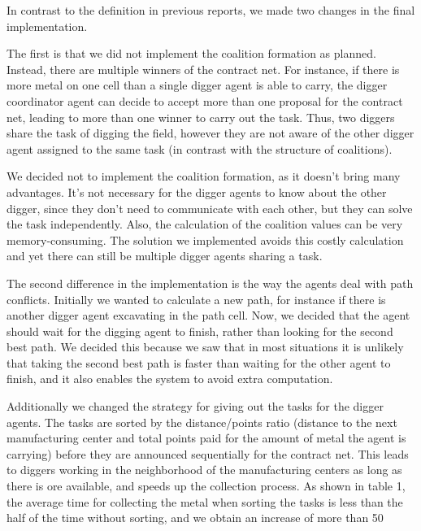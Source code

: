 In contrast to the definition in previous reports, we made two changes in the final implementation.

The first is that we did not implement the coalition formation as planned. Instead, there are multiple winners of the contract net. For instance, if there is more metal on one cell than a single digger agent is able to carry, the digger coordinator agent can decide to accept more than one proposal for the contract net, leading to more than one winner to carry out the task. Thus, two diggers share the task of digging the field, however they are not aware of the other digger agent assigned to the same task (in contrast with the structure of coalitions).

We decided not to implement the coalition formation, as it doesn't bring many advantages.  It's not necessary for the digger agents to know about the other digger, since they don't need to communicate with each other, but they can solve the task independently. Also, the calculation of the coalition values can be very memory-consuming. The solution we implemented avoids this costly calculation and yet there can still be multiple digger agents sharing a task.

The second difference in the implementation is the way the agents deal with path conflicts. Initially we wanted to calculate a new path, for instance if there is another digger agent excavating in the path cell. Now, we decided that the agent should wait for the digging agent to finish, rather than looking for the second best path. We decided this because we saw that in most situations it is unlikely that taking the second best path is faster than waiting for the other agent to finish, and it also enables the system to avoid extra computation.

Additionally we changed the strategy for giving out the tasks for the digger agents. The tasks are sorted by the distance/points ratio (distance to the next manufacturing center and total points paid for the amount of metal the agent is carrying) before they are announced sequentially for the contract net. This leads to diggers working in the neighborhood of the manufacturing centers as long as there is ore available, and speeds up the collection process. As shown in table 1, the average time for collecting the metal when sorting the tasks is less than the half of the time without sorting, and we obtain an increase of more than 50%

